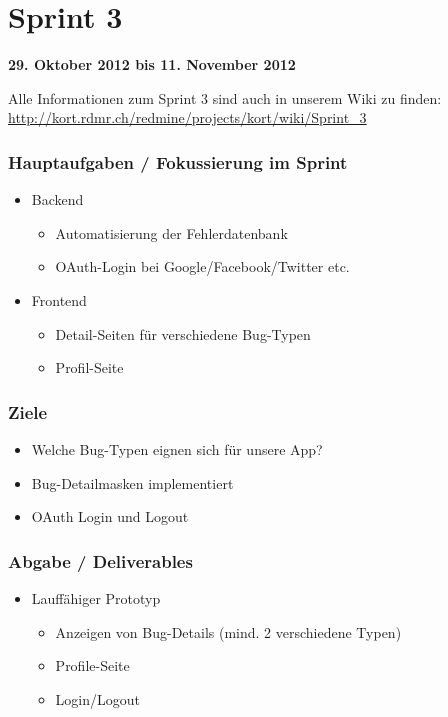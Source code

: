 \section{Sprint 3}

\textbf{29. Oktober 2012 bis 11. November 2012}

Alle Informationen zum Sprint 3 sind auch in unserem Wiki zu finden:
\url{http://kort.rdmr.ch/redmine/projects/kort/wiki/Sprint_3}

\subsubsection{Hauptaufgaben / Fokussierung im Sprint}

\begin{itemize}
	\item Backend
	\begin{itemize}
		\item Automatisierung der Fehlerdatenbank
		\item OAuth-Login bei Google/Facebook/Twitter etc.
	\end{itemize}
	\item Frontend
	\begin{itemize}
		\item Detail-Seiten für verschiedene Bug-Typen
		\item Profil-Seite
	\end{itemize}
\end{itemize}

\subsubsection{Ziele}
\begin{itemize}
	\item Welche Bug-Typen eignen sich für unsere App?
	\item Bug-Detailmasken implementiert
	\item OAuth Login und Logout
\end{itemize}

\subsubsection{Abgabe / Deliverables}

\begin{itemize}
	\item Lauffähiger Prototyp
	\begin{itemize}
		\item Anzeigen von Bug-Details (mind. 2 verschiedene Typen)
		\item Profile-Seite
		\item Login/Logout
	\end{itemize}
\end{itemize}

